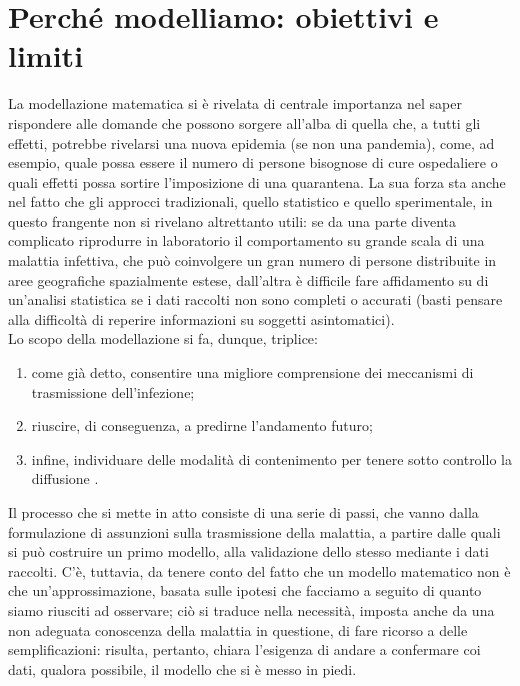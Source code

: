 \section{Perch\'{e} modelliamo: obiettivi e limiti}
La modellazione matematica si è rivelata di centrale importanza nel saper rispondere alle domande che possono sorgere all'alba di quella che, a tutti gli effetti, potrebbe rivelarsi una nuova epidemia (se non una pandemia), come, ad esempio, quale possa essere il numero di persone bisognose di cure ospedaliere o quali effetti possa sortire l'imposizione di una quarantena. La sua forza sta anche nel fatto che gli approcci tradizionali, quello statistico e quello sperimentale, in questo frangente non si rivelano altrettanto utili: se da una parte diventa complicato riprodurre in laboratorio il comportamento su grande scala di una malattia infettiva, che può coinvolgere un gran numero di persone distribuite in aree geografiche spazialmente estese, dall'altra è difficile fare affidamento su di un'analisi statistica se i dati raccolti non sono completi o accurati (basti pensare alla difficoltà di reperire informazioni su soggetti asintomatici). \\ Lo scopo della modellazione si fa, dunque, triplice:
\begin{enumerate}
\item come già detto, consentire una migliore comprensione dei meccanismi di trasmissione dell'infezione;
\item riuscire, di conseguenza, a predirne l'andamento futuro;
\item infine, individuare delle modalità di contenimento per tenere sotto controllo la diffusione \cite{Daley}.
\end{enumerate}
Il processo che si mette in atto consiste di una serie di passi, che vanno dalla formulazione di assunzioni sulla trasmissione della malattia, a partire dalle quali si può costruire un primo modello, alla validazione dello stesso mediante i dati raccolti. C'è, tuttavia, da tenere conto del fatto che un modello matematico non è che un'approssimazione, basata sulle ipotesi che facciamo a seguito di quanto siamo riusciti ad osservare; ciò si traduce nella necessità, imposta anche da una non adeguata conoscenza della malattia in questione, di fare ricorso a delle semplificazioni: risulta, pertanto, chiara l'esigenza di andare a confermare coi dati, qualora possibile, il modello che si è messo in piedi. 
